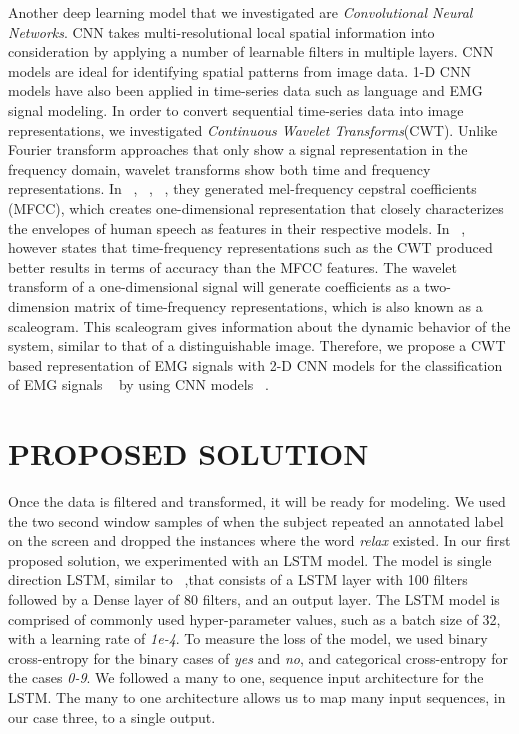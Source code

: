\documentclass{article}
\begin{document}
Another deep learning model that we investigated are \textit{Convolutional Neural Networks}. CNN takes multi-resolutional local spatial information into consideration by applying a number of learnable filters in multiple layers.  CNN models are ideal for identifying spatial patterns from image data. 1-D CNN models have also been applied in time-series data such as language and EMG signal modeling.  In order to convert sequential time-series data into image representations, we investigated \textit{Continuous Wavelet Transforms}(CWT). Unlike Fourier transform approaches that only show a signal representation in the frequency domain, wavelet transforms show both time and frequency representations. In ~\cite{janke_emg--speech:_2017}, ~\cite{kapur_alterego:_2018}, ~\cite{diener_session-independent_nodate}, they generated mel-frequency cepstral coefficients (MFCC), which creates one-dimensional representation that closely characterizes the envelopes of human speech as features in their respective models. In ~\cite{huzaifah_comparison_2017}, however states that time-frequency representations such as the CWT produced better results in terms of accuracy than the MFCC features. The wavelet transform of a one-dimensional signal will generate coefficients as a two-dimension matrix of time-frequency representations, which is also known as a scaleogram. This scaleogram gives information about the dynamic behavior of the system, similar to that of a distinguishable image. Therefore, we propose a CWT based representation of EMG signals with 2-D CNN models  for the classification of EMG signals ~\cite{pauk_419._2008} by using CNN models ~\cite{huzaifah_comparison_2017}.

\section{PROPOSED SOLUTION}
\label{sec:PROPOSED SOLUTION}

Once the data is filtered and transformed, it will be ready for modeling. We used the two second window samples of when the subject repeated an annotated label on the screen and dropped the instances where the word \textit{relax} existed. In our first proposed solution, we experimented with an LSTM model. The model is single direction LSTM, similar to ~\cite{janke_emg--speech:_2017},that consists of a LSTM layer with 100 filters followed by a Dense layer of 80 filters, and an output layer. The LSTM model is comprised of commonly used hyper-parameter values, such as a batch size of 32, with a learning rate of \textit{1e-4}. To measure the loss of the model, we used binary cross-entropy for the binary cases of \textit{yes} and \textit{no}, and categorical cross-entropy for the cases \textit{0-9}. We followed a many to one, sequence input architecture for the LSTM. The many to one architecture allows us to map many input sequences, in our case three, to a single output.
\end{document}
